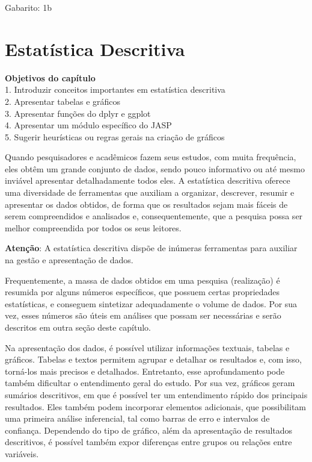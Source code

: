\documentclass[
]{book}
\newenvironment{objectives}{
  \definecolor{shadecolor}{rgb}{0.764,0.992,0.686}  %
  \color{black}
  \begin{shaded}}
 {\end{shaded}}
\begin{document}
Gabarito: 1b

\hypertarget{estatuxedstica-descritiva}{%
\chapter{Estatística Descritiva}\label{estatuxedstica-descritiva}}

\begin{objectives}
\textbf{Objetivos do capítulo}\\
1. Introduzir conceitos importantes em estatística descritiva\\
2. Apresentar tabelas e gráficos\\
3. Apresentar funções do dplyr e ggplot\\
4. Apresentar um módulo específico do JASP\\
5. Sugerir heurísticas ou regras gerais na criação de gráficos

\end{objectives}

Quando pesquisadores e acadêmicos fazem seus estudos, com muita frequência, eles obtêm um grande conjunto de dados, sendo pouco informativo ou até mesmo inviável apresentar detalhadamente todos eles. A estatística descritiva oferece uma diversidade de ferramentas que auxiliam a organizar, descrever, resumir e apresentar os dados obtidos, de forma que os resultados sejam mais fáceis de serem compreendidos e analisados e, consequentemente, que a pesquisa possa ser melhor compreendida por todos os seus leitores.

\textbf{Atenção}: A estatística descritiva dispõe de inúmeras ferramentas para auxiliar na gestão e apresentação de dados.

Frequentemente, a massa de dados obtidos em uma pesquisa (realização) é resumida por alguns números específicos, que possuem certas propriedades estatísticas, e conseguem sintetizar adequadamente o volume de dados. Por sua vez, esses números são úteis em análises que possam ser necessárias e serão descritos em outra seção deste capítulo.

Na apresentação dos dados, é possível utilizar informações textuais, tabelas e gráficos. Tabelas e textos permitem agrupar e detalhar os resultados e, com isso, torná-los mais precisos e detalhados. Entretanto, esse aprofundamento pode também dificultar o entendimento geral do estudo. Por sua vez, gráficos geram sumários descritivos, em que é possível ter um entendimento rápido dos principais resultados. Eles também podem incorporar elementos adicionais, que possibilitam uma primeira análise inferencial, tal como barras de erro e intervalos de confiança. Dependendo do tipo de gráfico, além da apresentação de resultados descritivos, é possível também expor diferenças entre grupos ou relações entre variáveis.
\end{document}
